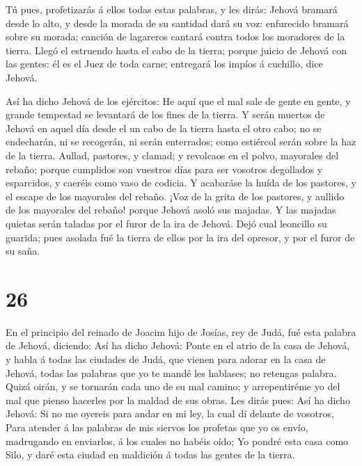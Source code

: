  Tú pues, profetizarás á ellos todas estas palabras, y les
dirás: Jehová bramará desde lo alto, y desde la morada de su santidad
dará su voz: enfurecido bramará sobre su morada; canción de lagareros
cantará contra todos los moradores de la tierra.  Llegó el
estruendo hasta el cabo de la tierra; porque juicio de Jehová con las
gentes: él es el Juez de toda carne; entregará los impíos á cuchillo,
dice Jehová.

 Así ha dicho Jehová de los ejércitos: He aquí que el mal
sale de gente en gente, y grande tempestad se levantará de los fines de
la tierra.  Y serán muertos de Jehová en aquel día desde el
un cabo de la tierra hasta el otro cabo; no se endecharán, ni se
recogerán, ni serán enterrados; como estiércol serán sobre la haz de la
tierra.  Aullad, pastores, y clamad; y revolcaos en el
polvo, mayorales del rebaño; porque cumplidos son vuestros días para ser
vosotros degollados y esparcidos, y caeréis como vaso de codicia.
 Y acabaráse la huída de los pastores, y el escape de los
mayorales del rebaño.  ¡Voz de la grita de los pastores, y
aullido de los mayorales del rebaño! porque Jehová asoló sus majadas.
 Y las majadas quietas serán taladas por el furor de la ira
de Jehová.  Dejó cual leoncillo su guarida; pues asolada
fué la tierra de ellos por la ira del opresor, y por el furor de su
saña.

\hypertarget{section-25}{%
\section{26}\label{section-25}}

 En el principio del reinado de Joacim hijo de Josías, rey
de Judá, fué esta palabra de Jehová, diciendo:  Así ha dicho
Jehová: Ponte en el atrio de la casa de Jehová, y habla á todas las
ciudades de Judá, que vienen para adorar en la casa de Jehová, todas las
palabras que yo te mandé les hablases; no retengas palabra. 
Quizá oirán, y se tornarán cada uno de su mal camino; y arrepentiréme yo
del mal que pienso hacerles por la maldad de sus obras.  Les
dirás pues: Así ha dicho Jehová: Si no me oyereis para andar en mi ley,
la cual dí delante de vosotros,  Para atender á las palabras
de mis siervos los profetas que yo os envío, madrugando en enviarlos, á
los cuales no habéis oído;  Yo pondré esta casa como Silo, y
daré esta ciudad en maldición á todas las gentes de la tierra.

